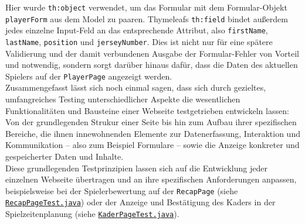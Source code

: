 Hier wurde \texttt{th:object} verwendet, um das Formular mit dem Formular-Objekt 
\texttt{playerForm} aus dem Model zu paaren. Thymeleafs \texttt{th:field} bindet 
außerdem jedes einzelne Input-Feld an das entsprechende Attribut, also 
\texttt{firstName}, \texttt{lastName}, \texttt{position} und \texttt{jerseyNumber}. 
Dies ist nicht nur für eine spätere Validierung und der damit verbundenen Ausgabe 
der Formular-Fehler von Vorteil und notwendig, sondern sorgt darüber hinaus dafür, 
dass die Daten des aktuellen Spielers auf der \texttt{PlayerPage} angezeigt 
werden. \\ 
Zusammengefasst lässt sich noch einmal sagen, dass sich durch gezieltes, 
umfangreiches Testing unterschiedlicher Aspekte die wesentlichen Funktionalitäten 
und Bausteine einer Webseite testgetrieben entwickeln lassen: Von der 
grundlegenden Strukur einer Seite bis hin zum Aufbau ihrer spezifischen Bereiche, 
die ihnen innewohnenden Elemente zur Datenerfassung, Interaktion und Kommunikation 
-- also zum Beispiel Formulare -- sowie die Anzeige konkreter und gespeicherter 
Daten und Inhalte. \\ 
Diese grundlegenden Testprinzipien lassen sich auf die Entwicklung jeder einzelnen 
Webseite übertragen und an ihre spezifischen Anforderungen anpassen, 
beispielsweise bei der Spielerbewertung auf der \texttt{RecapPage} (siehe 
\href{https://github.com/FlorianOhmes/bat_spielzeitenplaner/blob/main/spielzeitenplaner/src/test/java/de/bathesis/spielzeitenplaner/templates/recap/RecapPageTest.java}{{\texttt{RecapPageTest.java}}})
oder der Anzeige und Bestätigung des Kaders in der Spielzeitenplanung (siehe 
\href{https://github.com/FlorianOhmes/bat_spielzeitenplaner/blob/main/spielzeitenplaner/src/test/java/de/bathesis/spielzeitenplaner/templates/spielzeiten/KaderPageTest.java}{\texttt{KaderPageTest.java}}). 

